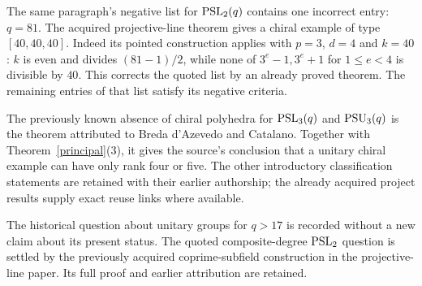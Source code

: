 \documentclass[11pt]{article}
\begin{document}
The same paragraph's negative list for $\operatorname{PSL}_2(q)$ contains one
incorrect entry: $q=81$. The acquired projective-line theorem gives a
chiral example of type $[40,40,40]$. Indeed its pointed construction
applies with $p=3$, $d=4$ and $k=40$: $k$ is even and divides
$(81-1)/2$, while none of $3^e-1,3^e+1$ for $1\le e<4$ is divisible
by $40$. This corrects the quoted list by an already proved theorem.
The remaining entries of that list satisfy its negative criteria.

The previously known absence of chiral polyhedra for $\operatorname{PSL}_3(q)$ and
$\operatorname{PSU}_3(q)$ is the theorem attributed to Breda d'Azevedo and Catalano.
Together with Theorem~\ref{principal}(3), it gives the source's
conclusion that a unitary chiral example can have only rank four or
five. The other introductory classification statements are retained
with their earlier authorship; the already acquired project results
supply exact reuse links where available.

The historical question about unitary groups for $q>17$ is recorded
without a new claim about its present status. The quoted composite-degree
$\operatorname{PSL}_2$ question is settled by the previously acquired coprime-subfield
construction in the projective-line paper. Its full proof and earlier
attribution are retained.
\end{document}
